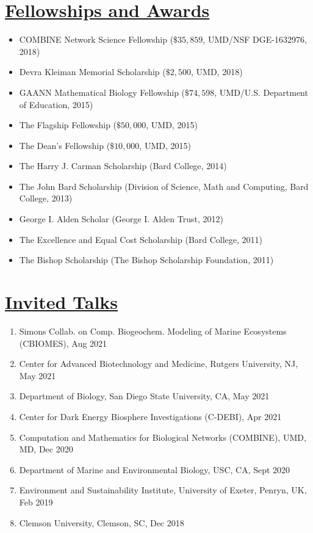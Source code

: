\documentclass[]{res}
\begin{document}
\begin{resume}
   \section{\underline{Fellowships and Awards}} %
\begin{itemize}[leftmargin=*]
\item[] COMBINE Network Science Fellowship ($\$35,859$, UMD/NSF DGE-1632976, 2018)
\item[] Devra Kleiman Memorial Scholarship ($\$2,500$, UMD, 2018)
\item[] GAANN Mathematical Biology Fellowship ($\$74,598$, UMD/U.S. Department of Education, 2015)
\item[] The Flagship Fellowship ($\$50,000$, UMD, 2015)
\item[] The Dean's Fellowship ($\$10,000$, UMD, 2015)
\item[] The Harry J. Carman Scholarship (Bard College, 2014)
\item[] The John Bard Scholarship (Division of Science, Math and Computing, Bard College, 2013)
\item[] George I. Alden Scholar (George I. Alden Trust, 2012)%
\item[] The Excellence and Equal Cost Scholarship (Bard College, 2011) 
\item[] The Bishop Scholarship (The Bishop Scholarship Foundation, 2011)
\end{itemize}
  
   \section{\underline{Invited Talks}} \vspace{2mm}
    \begin{enumerate}[leftmargin=*]
\item Simons Collab. on Comp. Biogeochem. Modeling of Marine Ecosystems (CBIOMES), Aug 2021
\item Center for Advanced Biotechnology and Medicine, Rutgers University, NJ, May 2021
\item Department of Biology, San Diego State University, CA, May 2021
\item Center for Dark Energy Biosphere Investigations (C-DEBI), Apr 2021
\item Computation and Mathematics for Biological Networks (COMBINE), UMD, MD, Dec 2020
\item Department of Marine and Environmental Biology, USC, CA, Sept 2020
\item Environment and Sustainability Institute, University of Exeter, Penryn, UK, Feb 2019
\item Clemson University, Clemson, SC, Dec 2018
\end{enumerate}


\end{resume}
\end{document}
